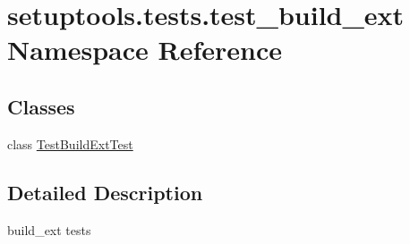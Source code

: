 \hypertarget{namespacesetuptools_1_1tests_1_1test__build__ext}{}\section{setuptools.\+tests.\+test\+\_\+build\+\_\+ext Namespace Reference}
\label{namespacesetuptools_1_1tests_1_1test__build__ext}
\subsection*{Classes}
\begin{DoxyCompactItemize}
\item 
class \hyperlink{classsetuptools_1_1tests_1_1test__build__ext_1_1TestBuildExtTest}{Test\+Build\+Ext\+Test}
\end{DoxyCompactItemize}


\subsection{Detailed Description}
\begin{DoxyVerb}build_ext tests
\end{DoxyVerb}
 